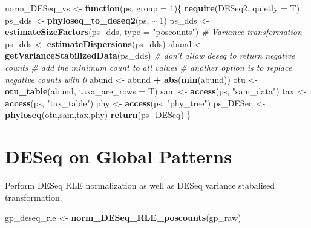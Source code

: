\documentclass[
]{book}
\newenvironment{Shaded}{\begin{snugshade}}{\end{snugshade}}
\newcommand{\CommentTok}[1]{\textcolor[rgb]{0.56,0.35,0.01}{\textit{#1}}}
\newcommand{\ControlFlowTok}[1]{\textcolor[rgb]{0.13,0.29,0.53}{\textbf{#1}}}
\newcommand{\DataTypeTok}[1]{\textcolor[rgb]{0.13,0.29,0.53}{#1}}
\newcommand{\DecValTok}[1]{\textcolor[rgb]{0.00,0.00,0.81}{#1}}
\newcommand{\KeywordTok}[1]{\textcolor[rgb]{0.13,0.29,0.53}{\textbf{#1}}}
\newcommand{\NormalTok}[1]{#1}
\newcommand{\OperatorTok}[1]{\textcolor[rgb]{0.81,0.36,0.00}{\textbf{#1}}}
\newcommand{\StringTok}[1]{\textcolor[rgb]{0.31,0.60,0.02}{#1}}
\begin{document}
\begin{Shaded}
\begin{Highlighting}[]
\NormalTok{norm\_DESeq\_vs \textless{}{-}}\StringTok{ }\ControlFlowTok{function}\NormalTok{(ps, }\DataTypeTok{group =} \DecValTok{1}\NormalTok{)\{}
  \KeywordTok{require}\NormalTok{(DESeq2, }\DataTypeTok{quietly =}\NormalTok{ T)}
\NormalTok{  ps\_dds \textless{}{-}}\StringTok{ }\KeywordTok{phyloseq\_to\_deseq2}\NormalTok{(ps, }\OperatorTok{\textasciitilde{}}\StringTok{ }\DecValTok{1}\NormalTok{)}
\NormalTok{  ps\_dds \textless{}{-}}\StringTok{ }\KeywordTok{estimateSizeFactors}\NormalTok{(ps\_dds, }\DataTypeTok{type =} \StringTok{"poscounts"}\NormalTok{)}
  \CommentTok{\# Variance transformation}
\NormalTok{  ps\_dds \textless{}{-}}\StringTok{ }\KeywordTok{estimateDispersions}\NormalTok{(ps\_dds)}
\NormalTok{  abund \textless{}{-}}\StringTok{ }\KeywordTok{getVarianceStabilizedData}\NormalTok{(ps\_dds)}
  \CommentTok{\# don’t allow deseq to return negative counts}
  \CommentTok{\# add the minimum count to all values}
  \CommentTok{\# another option is to replace negative counts with 0}
\NormalTok{  abund \textless{}{-}}\StringTok{ }\NormalTok{abund }\OperatorTok{+}\StringTok{ }\KeywordTok{abs}\NormalTok{(}\KeywordTok{min}\NormalTok{(abund)) }
\NormalTok{  otu \textless{}{-}}\StringTok{ }\KeywordTok{otu\_table}\NormalTok{(abund, }\DataTypeTok{taxa\_are\_rows =}\NormalTok{ T)}
\NormalTok{  sam \textless{}{-}}\StringTok{ }\KeywordTok{access}\NormalTok{(ps, }\StringTok{"sam\_data"}\NormalTok{)}
\NormalTok{  tax \textless{}{-}}\StringTok{ }\KeywordTok{access}\NormalTok{(ps, }\StringTok{"tax\_table"}\NormalTok{)}
\NormalTok{  phy \textless{}{-}}\StringTok{ }\KeywordTok{access}\NormalTok{(ps, }\StringTok{"phy\_tree"}\NormalTok{)}
\NormalTok{  ps\_DESeq \textless{}{-}}\StringTok{ }\KeywordTok{phyloseq}\NormalTok{(otu,sam,tax,phy)}
  \KeywordTok{return}\NormalTok{(ps\_DESeq)}
\NormalTok{\}}
\end{Highlighting}
\end{Shaded}

\hypertarget{deseq-on-global-patterns}{%
\section{DESeq on Global Patterns}\label{deseq-on-global-patterns}}

Perform DESeq RLE normalization as well as DESeq variance stabalised transformation.

\begin{Shaded}
\begin{Highlighting}[]
\NormalTok{gp\_deseq\_rle \textless{}{-}}\StringTok{ }\KeywordTok{norm\_DESeq\_RLE\_poscounts}\NormalTok{(gp\_raw)}
\end{Highlighting}
\end{Shaded}
\end{document}
